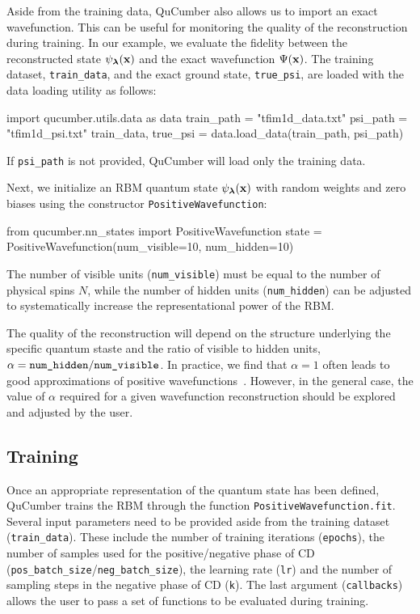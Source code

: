 \documentclass[submission, Phys, hidelnks]{SciPost}
\begin{document}
Aside from the training data, QuCumber also allows us to import an exact wavefunction. This can be useful for monitoring the quality of the reconstruction during training. In our example, we evaluate the fidelity between the reconstructed state $\psi_{\bm{\lambda}}(\bf{x})$ and the exact wavefunction $\Psi(\bf{x})$.
The training dataset, \verb|train_data|, and the exact ground state, \verb|true_psi|, are loaded with the data loading utility as follows:
\begin{python}
import qucumber.utils.data as data
train_path = "tfim1d_data.txt"
psi_path = "tfim1d_psi.txt"
train_data, true_psi = data.load_data(train_path, psi_path)
\end{python}
If \verb|psi_path| is not provided, QuCumber will load only the training data. 

Next, we initialize an RBM quantum state $\psi_{\bm{\lambda}}(\bf{x})$ with random weights and zero biases using the constructor \verb|PositiveWavefunction|:
\begin{python}
from qucumber.nn_states import PositiveWavefunction
state = PositiveWavefunction(num_visible=10, num_hidden=10)
\end{python}
The number of visible units (\verb|num_visible|) must be equal to the number of physical spins $N$, while the number of hidden units (\verb|num_hidden|) can be adjusted to systematically increase the representational power of the RBM. 

The quality of the reconstruction will depend on the structure underlying the specific quantum staste and the ratio of visible to hidden units, $\alpha = \verb|num_hidden|/\verb|num_visible|$.
In practice, we find that $\alpha = 1$ often leads to good approximations of positive wavefunctions~\cite{torlai2018tomography}. However, in the general case, the value of $\alpha$ required for a given wavefunction reconstruction should be explored and adjusted by the user.


\subsection{Training}
Once an appropriate representation of the quantum state has been defined, QuCumber trains the RBM through the function \verb|PositiveWavefunction.fit|. Several input parameters need to be provided aside from the training dataset (\verb|train_data|). These include the number of training iterations (\verb|epochs|), the number of samples used for the positive/negative phase of CD (\verb|pos_batch_size|/\verb|neg_batch_size|), the learning rate (\verb|lr|) and the number of sampling steps in the negative phase of CD (\verb|k|). The last argument (\verb|callbacks|) allows the user to pass a set of functions to be evaluated during training.
\end{document}
